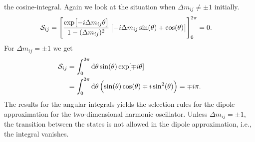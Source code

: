             the cosine-integral.
            Again we look at the situation when $\Delta m_{ij} \neq \pm 1$
            initially.
            \begin{align}
                \mathcal{S}_{ij}
                &= \left[ 
                    \frac{\exp[-i\Delta m_{ij} \theta]}{1 - (\Delta m_{ij})^2}
                    \left[ 
                        -i\Delta m_{ij} \sin(\theta)
                        + \cos(\theta)
                     \right]
                 \right]_{0}^{2\pi}
                = 0.
            \end{align}
            For $\Delta m_{ij} = \pm 1$ we get
            \begin{align}
                \mathcal{S}_{ij}
                &=
                \int_{0}^{2\pi}
                \dd\theta
                \sin(\theta)
                \exp[\mp i\theta]
                \\
                &=
                \int_{0}^{2\pi}
                \dd\theta
                \left( 
                    \sin(\theta)\cos(\theta)
                    \mp i\sin^2(\theta)
                 \right)
                = \mp i\pi.
            \end{align}
            The results for the angular integrals yields the selection rules for
            the dipole approximation for the two-dimensional harmonic
            oscillator.
            Unless $\Delta m_{ij} = \pm 1$, the transition between the states is
            not allowed in the dipole approximation, i.e., the integral
            vanishes.


